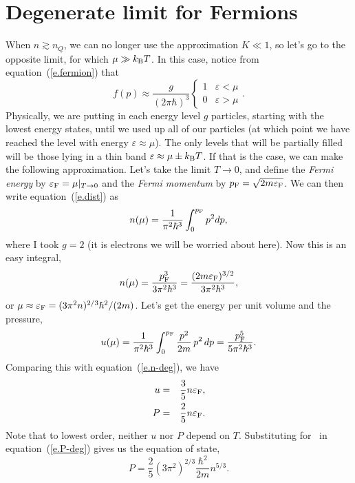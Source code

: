 \section{Degenerate limit for Fermions}\label{s.deg-limit-fermions}
When $n\gtrsim n_{Q}$, we can no longer use the approximation $K \ll 1$, so let's go to the opposite limit, for which $\mu \gg k_\mathrm{B} T$.  In this case, notice from equation~(\ref{e.fermion}) that
\begin{equation}
f(p) \approx \frac{g}{(2\pi\hbar)^{3}}\left\{\begin{array}{lr} 1 & \varepsilon < \mu\\ 0 & \varepsilon> \mu\end{array}\right. .
\end{equation}
Physically, we are putting in each energy level $g$ particles, starting with the lowest energy states, until we used up all of our particles (at which point we have reached the level with energy $\varepsilon \approx \mu$).  The only levels that will be partially filled will be those lying in a thin band $\varepsilon \approx\mu \pm k_\mathrm{B} T$.  If that is the case, we can make the following approximation.  Let's take the limit $T \to 0$, and define the \emph{Fermi energy} by $\varepsilon_{\mathrm{F}} = \mu|_{T\to 0}$ and the \emph{Fermi momentum} by $p_{\mathrm{F}} = \sqrt{2m\varepsilon_{\mathrm{F}}}$.  We can then write equation~(\ref{e.dist}) as
\begin{equation}
n(\mu) = \frac{1}{\pi^{2}\hbar^{3}}\int_{0}^{p_{\mathrm{F}}} p^{2} dp,
\end{equation}
where I took $g = 2$ (it is electrons we will be worried about here).  Now this is an easy integral,
\begin{equation}\label{e.n-deg}
n(\mu) = \frac{p_{\mathrm{F}}^{3}}{3\pi^{2}\hbar^{3}} = \frac{(2m\varepsilon_{\mathrm{F}})^{3/2}}{3\pi^{2}\hbar^{3}},
\end{equation}
or $\mu \approx \varepsilon_{\mathrm{F}} = (3\pi^{2}n)^{2/3} \hbar^{2}/(2m)$.  Let's get the energy per unit volume and the pressure,
\begin{equation}
u(\mu) = \frac{1}{\pi^{2}\hbar^{3}}\int_{0}^{p_{\mathrm{F}}} \frac{p^{2}}{2m}\,p^{2}\,dp = \frac{p_{\mathrm{F}}^{5}}{5\pi^{2}\hbar^{3}}.
\end{equation}
Comparing this with equation~(\ref{e.n-deg}), we have
\begin{eqnarray}
u &=& \frac{3}{5}n\varepsilon_{\mathrm{F}},\label{e.u-deg}\\
P &=& \frac{2}{5}n\varepsilon_{\mathrm{F}}\label{e.P-deg}.
\end{eqnarray}
Note that to lowest order, neither $u$ nor $P$ depend on $T$.  Substituting for \eF\ in equation~(\ref{e.P-deg}) gives us the equation of state,
\begin{equation}\label{e.eos-deg}
P = \frac{2}{5}\left(3\pi^{2}\right)^{2/3}\frac{\hbar^{2}}{2m}n^{5/3}.
\end{equation}

